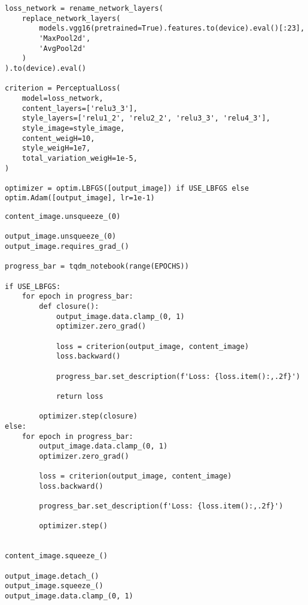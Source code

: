 \begin{listing}[H]
\begin{verbatim}
loss_network = rename_network_layers(
    replace_network_layers(
        models.vgg16(pretrained=True).features.to(device).eval()[:23],
        'MaxPool2d',
        'AvgPool2d'
    )
).to(device).eval()

criterion = PerceptualLoss(
    model=loss_network,
    content_layers=['relu3_3'],
    style_layers=['relu1_2', 'relu2_2', 'relu3_3', 'relu4_3'],
    style_image=style_image,    
    content_weigH=10,
    style_weigH=1e7,
    total_variation_weigH=1e-5,
)

optimizer = optim.LBFGS([output_image]) if USE_LBFGS else optim.Adam([output_image], lr=1e-1)
\end{verbatim}
\label{lst:neural_style_transfer_4}
\end{listing}

\pagebreak

\begin{listing}[H]
\begin{verbatim}
content_image.unsqueeze_(0)

output_image.unsqueeze_(0)
output_image.requires_grad_()

progress_bar = tqdm_notebook(range(EPOCHS))

if USE_LBFGS:
    for epoch in progress_bar:
        def closure():
            output_image.data.clamp_(0, 1)
            optimizer.zero_grad()

            loss = criterion(output_image, content_image)
            loss.backward()

            progress_bar.set_description(f'Loss: {loss.item():,.2f}')

            return loss

        optimizer.step(closure)
else:
    for epoch in progress_bar:
        output_image.data.clamp_(0, 1)
        optimizer.zero_grad()

        loss = criterion(output_image, content_image)
        loss.backward()

        progress_bar.set_description(f'Loss: {loss.item():,.2f}')

        optimizer.step()


content_image.squeeze_()

output_image.detach_()
output_image.squeeze_()
output_image.data.clamp_(0, 1)
\end{verbatim}
\label{lst:neural_style_transfer_5}
\end{listing}

